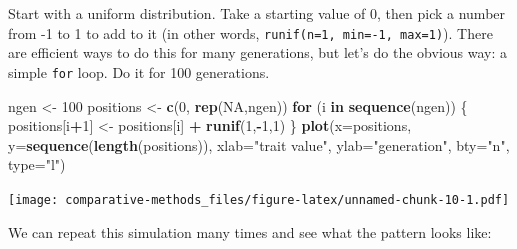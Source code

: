 \documentclass[
]{article}
\newenvironment{Shaded}{\begin{snugshade}}{\end{snugshade}}
\newcommand{\ControlFlowTok}[1]{\textcolor[rgb]{0.13,0.29,0.53}{\textbf{#1}}}
\newcommand{\DataTypeTok}[1]{\textcolor[rgb]{0.13,0.29,0.53}{#1}}
\newcommand{\DecValTok}[1]{\textcolor[rgb]{0.00,0.00,0.81}{#1}}
\newcommand{\KeywordTok}[1]{\textcolor[rgb]{0.13,0.29,0.53}{\textbf{#1}}}
\newcommand{\NormalTok}[1]{#1}
\newcommand{\OperatorTok}[1]{\textcolor[rgb]{0.81,0.36,0.00}{\textbf{#1}}}
\newcommand{\OtherTok}[1]{\textcolor[rgb]{0.56,0.35,0.01}{#1}}
\newcommand{\StringTok}[1]{\textcolor[rgb]{0.31,0.60,0.02}{#1}}
\begin{document}
Start with a uniform distribution. Take a starting value of 0, then pick a number from -1 to 1 to add to it (in other words, \texttt{runif(n=1,\ min=-1,\ max=1)}). There are efficient ways to do this for many generations, but let's do the obvious way: a simple \texttt{for} loop. Do it for 100 generations.

\begin{Shaded}
\begin{Highlighting}[]
\NormalTok{ngen <{-}}\StringTok{ }\DecValTok{100}
\NormalTok{positions <{-}}\StringTok{ }\KeywordTok{c}\NormalTok{(}\DecValTok{0}\NormalTok{, }\KeywordTok{rep}\NormalTok{(}\OtherTok{NA}\NormalTok{,ngen))}
\ControlFlowTok{for}\NormalTok{ (i }\ControlFlowTok{in} \KeywordTok{sequence}\NormalTok{(ngen)) \{}
\NormalTok{  positions[i}\OperatorTok{+}\DecValTok{1}\NormalTok{] <{-}}\StringTok{ }\NormalTok{positions[i] }\OperatorTok{+}\StringTok{ }\KeywordTok{runif}\NormalTok{(}\DecValTok{1}\NormalTok{,}\OperatorTok{{-}}\DecValTok{1}\NormalTok{,}\DecValTok{1}\NormalTok{)}
\NormalTok{\}}
\KeywordTok{plot}\NormalTok{(}\DataTypeTok{x=}\NormalTok{positions, }\DataTypeTok{y=}\KeywordTok{sequence}\NormalTok{(}\KeywordTok{length}\NormalTok{(positions)), }\DataTypeTok{xlab=}\StringTok{"trait value"}\NormalTok{, }\DataTypeTok{ylab=}\StringTok{"generation"}\NormalTok{, }\DataTypeTok{bty=}\StringTok{"n"}\NormalTok{, }\DataTypeTok{type=}\StringTok{"l"}\NormalTok{)}
\end{Highlighting}
\end{Shaded}

\texttt{[image: comparative-methods\_files/figure-latex/unnamed-chunk-10-1.pdf]}

We can repeat this simulation many times and see what the pattern looks like:
\end{document}
